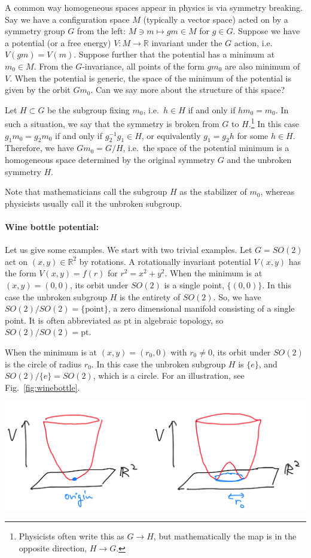 \documentclass[12pt]{article}
\numberwithin{equation}{section}
\theoremstyle{remark}
\renewenvironment{figure}[1][]{
  \begin{originalfigure}[#1]
    \begin{mdframed}[linecolor=black!0,backgroundcolor=black!1]
}{
    \end{mdframed}
  \end{originalfigure}
}
\def\bR{\mathbb{R}}
\def\pt{\mathrm{pt}}
\begin{document}
A common way homogeneous spaces appear in physics is via symmetry breaking.
Say we have a configuration space $M$ (typically a vector space) acted on by a symmetry group $G$ from the left:
$M\ni m\mapsto gm\in M$ for $g\in G$.
Suppose we have a potential (or a free energy) $V:M\to \bR$ invariant under the $G$ action, i.e.~$V(gm)=V(m)$.
Suppose further that the potential has a minimum at $m_0 \in M$. 
From the $G$-invariance, all points of the form $gm_0$ are also minimum of $V$.
When the potential is generic, the space of the minimum of the potential is given by the orbit $Gm_0$.
Can we say more about the structure of this space?

Let $H\subset G$ be the subgroup fixing $m_0$, i.e.~$h\in H$ if and only if $hm_0=m_0$.
In such a situation, we say that the symmetry is broken from $G$ to $H$.\footnote{%
Physicists often write this as $G\to H$, 
but mathematically the map is in the opposite direction, $H\to G$.}
In this case $g_1 m_0 = g_2 m_0$ if and only if $g_2^{-1} g_1 \in H$, 
or equivalently $g_1 = g_2 h$ for some $h\in H$.
Therefore, we have $Gm_0=G/H$, i.e.~the space of the potential minimum is a homogeneous space
determined by the original symmetry $G$ and the unbroken symmetry $H$.

Note that mathematicians call the subgroup $H$ as the stabilizer of $m_0$,
whereas physicists usually call it the unbroken subgroup.

\paragraph{Wine bottle potential:}
Let us give some examples.
We start with two trivial examples.
Let $G=SO(2)$ act on $(x,y)\in \bR^2$ by rotations.
A rotationally invariant potential $V(x,y)$ has the form
$V(x,y)=f(r)$ for $r^2=x^2+y^2$.
When the minimum is at $(x,y)=(0,0)$, its orbit under $SO(2)$ is a single point, $\{(0,0)\}$.
In this case the unbroken subgroup $H$ is the entirety of $SO(2)$.
So, we have $SO(2)/SO(2)=\{\text{point}\}$, a zero dimensional manifold consisting of a single point.
It is often abbreviated as $\pt$ in algebraic topology, so $SO(2)/SO(2)=\pt$.

When the minimum is at $(x,y)=(r_0,0)$ with $r_0\neq 0$,
its orbit under $SO(2)$ is the circle of radius $r_0$.
In this case the unbroken subgroup $H$ is $\{e\}$,
and $SO(2)/\{e\}=SO(2)$, which is a circle.
For an illustration, see Fig.~\ref{fig:winebottle}.

\begin{figure}[h]
\centering
\includegraphics[width=.7\textwidth]{winebottle.png}
\caption{Two choices of $SO(2)$-invariant potential functions $V(x,y)$,
with minimum either at the origin or at the circle of radius $r_0$.}
\label{fig:winebottle}
\end{figure}
\end{document}
